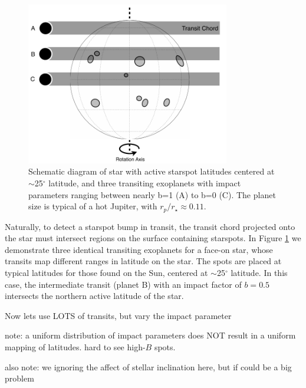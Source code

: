 \documentclass[preprint2]{aastex61}
\begin{document}
\begin{figure}[!t]
\centering
\includegraphics[width=3.5in]{diagram1}
\caption{
Schematic diagram of star with active starspot latitudes centered at $\sim$25$^\circ$ latitude, and three transiting exoplanets with impact parameters ranging between nearly b=1 (A) to  b=0 (C). The planet size is typical of a hot Jupiter, with $r_p/r_\star\approx0.11$.
}
\label{fig:diagram1}
\end{figure}


Naturally, to detect a starspot bump in transit, the transit chord projected onto the star must intersect regions on the surface containing starspots. In Figure \ref{fig:diagram1} we demonstrate three identical transiting exoplanets for a face-on star, whose transits map different ranges in latitude on the star. The spots are placed at typical latitudes for those found on the Sun, centered at $\sim$25$^\circ$ latitude. In this case, the intermediate transit (planet B) with an impact factor of $b=0.5$ intersects the northern active latitude of the star. 








Now lets use LOTS of transits, but vary the impact parameter

note: a uniform distribution of impact parameters does NOT result in a uniform mapping of latitudes. hard to see high-$B$ spots.

also note: we ignoring the affect of stellar inclination here, but if could be a big problem
\end{document}
